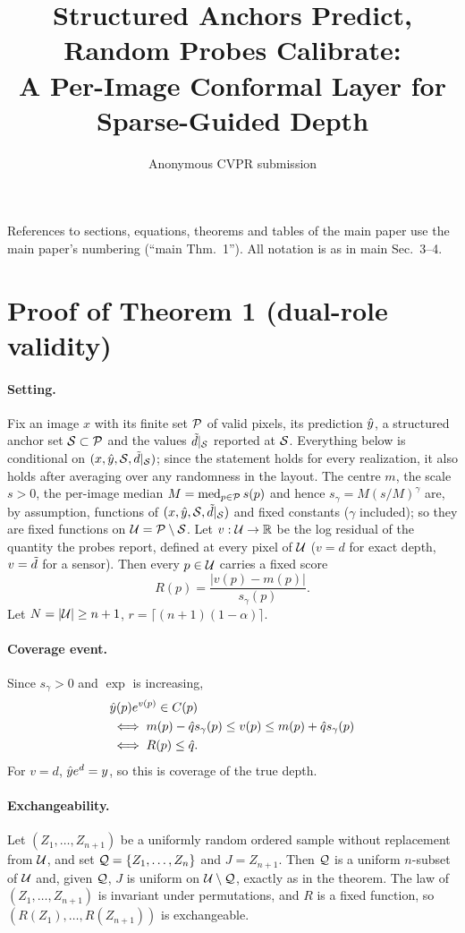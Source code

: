 \documentclass[10pt,twocolumn,letterpaper]{article}
\title{Structured Anchors Predict, Random Probes Calibrate:\\A Per-Image Conformal Layer for Sparse-Guided Depth}
\author{Anonymous CVPR submission}
\begin{document}
\maketitlesupplementary
\renewcommand{\thesection}{\Alph{section}}

\noindent References to sections, equations, theorems and tables of the main paper use the main paper's numbering (``main Thm.~1''). All notation is as in main Sec.~3--4.

\section{Proof of Theorem 1 (dual-role validity)}
\label{supp:proof-dual}

\paragraph{Setting.}
Fix an image $x$ with its finite set $\mathcal{P}$ of valid pixels, its prediction $\hat{y}$, a structured anchor set $\mathcal{S}\subset\mathcal{P}$ and the values $\tilde{d}|_{\mathcal{S}}$ reported at $\mathcal{S}$.
Everything below is conditional on $(x,\hat{y},\mathcal{S},\tilde{d}|_{\mathcal{S}})$; since the statement holds for every realization, it also holds after averaging over any randomness in the layout.
The centre $m$, the scale $s>0$, the per-image median $M=\operatorname{med}_{p\in\mathcal{P}}s(p)$ and hence $s_\gamma=M(s/M)^\gamma$ are, by assumption, functions of $(x,\hat{y},\mathcal{S},\tilde{d}|_{\mathcal{S}})$ and fixed constants ($\gamma$ included); so they are fixed functions on $\mathcal{U}=\mathcal{P}\setminus\mathcal{S}$.
Let $v:\mathcal{U}\to\mathbb{R}$ be the log residual of the quantity the probes report, defined at every pixel of $\mathcal{U}$ ($v=d$ for exact depth, $v=\tilde{d}$ for a sensor). Then every $p\in\mathcal{U}$ carries a fixed score
\begin{equation}
R(p)=\frac{|v(p)-m(p)|}{s_\gamma(p)} .
\end{equation}
Let $N=|\mathcal{U}|\ge n+1$, $r=\lceil (n+1)(1-\alpha)\rceil$.

\paragraph{Coverage event.}
Since $s_\gamma>0$ and $\exp$ is increasing,
\begin{align*}
&\hat{y}(p)e^{v(p)}\in C(p)\\
&\iff m(p)-\hat{q} s_\gamma(p)\le v(p)\le m(p)+\hat{q} s_\gamma(p)\\
&\iff R(p)\le \hat{q} .
\end{align*}
For $v=d$, $\hat{y} e^{d}=y$, so this is coverage of the true depth.

\paragraph{Exchangeability.}
Let $(Z_1,\dots,Z_{n+1})$ be a uniformly random ordered sample without replacement from $\mathcal{U}$, and set $\mathcal{Q}=\{Z_1,\dots,Z_n\}$ and $J=Z_{n+1}$.
Then $\mathcal{Q}$ is a uniform $n$-subset of $\mathcal{U}$ and, given $\mathcal{Q}$, $J$ is uniform on $\mathcal{U}\setminus\mathcal{Q}$, exactly as in the theorem.
The law of $(Z_1,\dots,Z_{n+1})$ is invariant under permutations, and $R$ is a fixed function, so $(R(Z_1),\dots,R(Z_{n+1}))$ is exchangeable.
\end{document}
